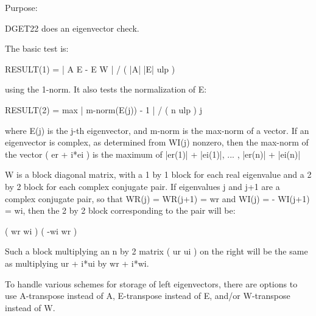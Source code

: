 \begin{DoxyParagraph}{Purpose\+: }
\begin{DoxyVerb} DGET22 does an eigenvector check.

 The basic test is:

    RESULT(1) = | A E  -  E W | / ( |A| |E| ulp )

 using the 1-norm.  It also tests the normalization of E:

    RESULT(2) = max | m-norm(E(j)) - 1 | / ( n ulp )
                 j

 where E(j) is the j-th eigenvector, and m-norm is the max-norm of a
 vector.  If an eigenvector is complex, as determined from WI(j)
 nonzero, then the max-norm of the vector ( er + i*ei ) is the maximum
 of
    |er(1)| + |ei(1)|, ... , |er(n)| + |ei(n)|

 W is a block diagonal matrix, with a 1 by 1 block for each real
 eigenvalue and a 2 by 2 block for each complex conjugate pair.
 If eigenvalues j and j+1 are a complex conjugate pair, so that
 WR(j) = WR(j+1) = wr and WI(j) = - WI(j+1) = wi, then the 2 by 2
 block corresponding to the pair will be:

    (  wr  wi  )
    ( -wi  wr  )

 Such a block multiplying an n by 2 matrix ( ur ui ) on the right
 will be the same as multiplying  ur + i*ui  by  wr + i*wi.

 To handle various schemes for storage of left eigenvectors, there are
 options to use A-transpose instead of A, E-transpose instead of E,
 and/or W-transpose instead of W.\end{DoxyVerb}
 
\end{DoxyParagraph}

